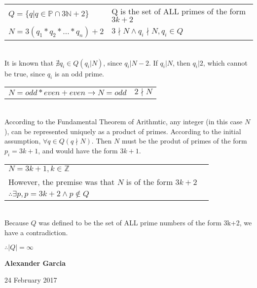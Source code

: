 \documentclass[11pt]{article}
\def\AND{\wedge}
\def\imp{\rightarrow}
\begin{document}
\begin{enumerate}
\begin{tabular}{ll}
			$Q = \{q | q \in \mathbb{P} \cap 3\mathbb{N}+2\}$& Q is the set of ALL primes of the form $3k + 2$ \\

			$N = 3(q_1*q_2*\dots*q_n)+2$ & $3 \nmid N \AND q_i \nmid N, q_i \in Q$ \\

		\end{tabular} \\

		It is known that $\nexists q_i \in Q (q_i | N)$, since $q_i | N-2$.
		If $q_i | N$, then $q_i | 2$, which cannot be true, since $q_i$ is an odd prime. \\

		\begin{tabular}{ll}

			$N = odd * even + even \imp N = odd$ & $2 \nmid N$ \\

		\end{tabular} \\

		According to the Fundamental Theorem of Arithmtic, any integer (in this case $N$),
		can be represented uniquely as a product of primes. According to the initial
		assumption, $\forall q \in Q(q \nmid N)$. Then $N$ must be the produt of
		primes of the form $p_i = 3k + 1$, and would have the form $3k+1$. \\

		\begin{tabular}{ll}

			$N = 3k + 1, k \in \mathbb{Z}$ \\

			However, the premise was that $N$ is of the form $3k + 2$ \\

			$\therefore \exists p, p = 3k + 2 \AND p \not\in Q$ \\

		\end{tabular} \\

		Because $Q$ was defined to be the set of ALL prime numbers of the form 3k+2, we
		have a contradiction.

		$\therefore |Q| = \infty$ \\

		\newpage

		\textbf{Alexander Garcia}

		24 February 2017 \\


\end{enumerate}
\end{document}
